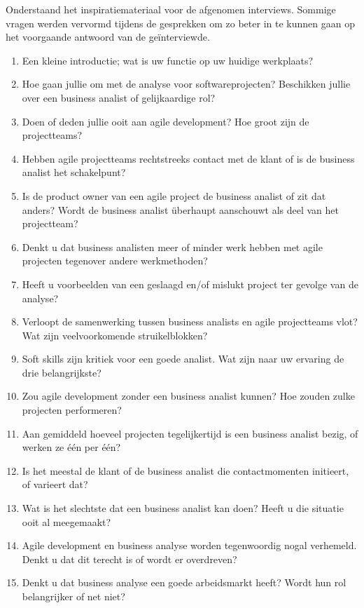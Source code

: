 \documentclass{hogent-article}
\begin{document}
Onderstaand het inspiratiemateriaal voor de afgenomen interviews. Sommige vragen werden vervormd
tijdens de gesprekken om zo beter in te kunnen gaan op het voorgaande antwoord van de geïnterviewde.

\vspace{5pt}

\begin{enumerate}[label=\bfseries\Alph* |]
  \item Een kleine introductie; wat is uw functie op uw huidige werkplaats?
  \item Hoe gaan jullie om met de analyse voor softwareprojecten? Beschikken jullie over een business analist of gelijkaardige rol?
  \item Doen of deden jullie ooit aan agile development? Hoe groot zijn de projectteams? 
  \item Hebben agile projectteams rechtstreeks contact met de klant of is de business analist het schakelpunt?
  \item Is de product owner van een agile project de business analist of zit dat anders? Wordt de business analist überhaupt aanschouwt als deel van het projectteam?
  \item Denkt u dat business analisten meer of minder werk hebben met agile projecten tegenover andere werkmethoden?
  \item Heeft u voorbeelden van een geslaagd en/of mislukt project ter gevolge van de analyse?
  \item Verloopt de samenwerking tussen business analists en agile projectteams vlot? Wat zijn veelvoorkomende struikelblokken?
  \item Soft skills zijn kritiek voor een goede analist. Wat zijn naar uw ervaring de drie belangrijkste?
  \item Zou agile development zonder een business analist kunnen? Hoe zouden zulke projecten performeren?
  \item Aan gemiddeld hoeveel projecten tegelijkertijd is een business analist bezig, of werken ze één per één?
  \item Is het meestal de klant of de business analist die contactmomenten initieert, of varieert dat?
  \item Wat is het slechtste dat een business analist kan doen? Heeft u die situatie ooit al meegemaakt?
  \item Agile development en business analyse worden tegenwoordig nogal verhemeld. Denkt u dat dit terecht is of wordt er overdreven?
  \item Denkt u dat business analyse een goede arbeidsmarkt heeft? Wordt hun rol belangrijker of net niet?
\end{enumerate}
 
\end{document}
